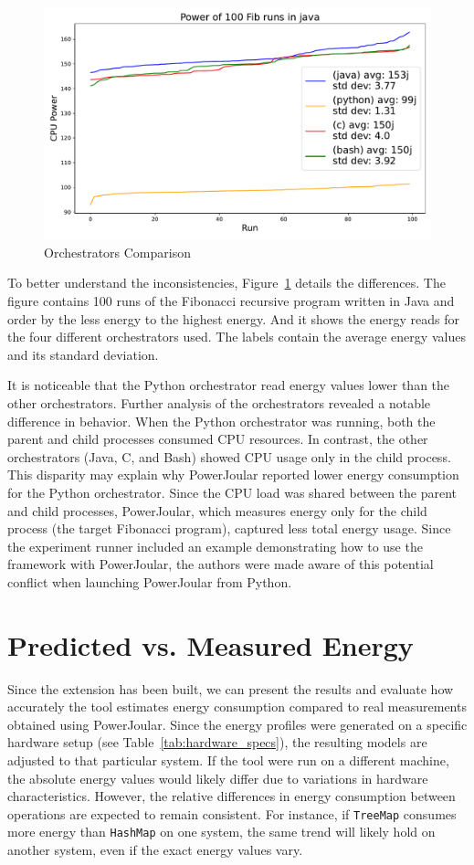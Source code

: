 \begin{figure}[htbp]
  \centering
  \includegraphics[width = .8 \textwidth]{figures/4_orchs_comparison.pdf}
  \caption{Orchestrators Comparison}
  \label{fig:4_orchs_comparison}
\end{figure}

To better understand the inconsistencies, Figure~\ref{fig:4_orchs_comparison} details the differences.
The figure contains 100 runs of the Fibonacci recursive program written in Java and order by the less energy to the highest energy. And it shows the energy reads for the four different orchestrators used. The labels contain the average energy values and its standard deviation.

It is noticeable that the Python orchestrator read energy values lower than the other orchestrators. Further analysis of the orchestrators revealed a notable difference in behavior. When the Python orchestrator was running, both the parent and child processes consumed CPU resources. In contrast, the other orchestrators (Java, C, and Bash) showed CPU usage only in the child process. This disparity may explain why PowerJoular reported lower energy consumption for the Python orchestrator. Since the CPU load was shared between the parent and child processes, PowerJoular, which measures energy only for the child process (the target Fibonacci program), captured less total energy usage.
Since the experiment runner included an example demonstrating how to use the framework with PowerJoular, the authors were made aware of this potential conflict when launching PowerJoular from Python.

\section{Predicted vs. Measured Energy} \label{sec:predicted_vs_measured_energy}

Since the extension has been built, we can present the results and evaluate how accurately the tool estimates energy consumption compared to real measurements obtained using PowerJoular. Since the energy profiles were generated on a specific hardware setup (see Table~\ref{tab:hardware_specs}), the resulting models are adjusted to that particular system. If the tool were run on a different machine, the absolute energy values would likely differ due to variations in hardware characteristics. However, the relative differences in energy consumption between operations are expected to remain consistent. For instance, if \texttt{TreeMap} consumes more energy than \texttt{HashMap} on one system, the same trend will likely hold on another system, even if the exact energy values vary.

